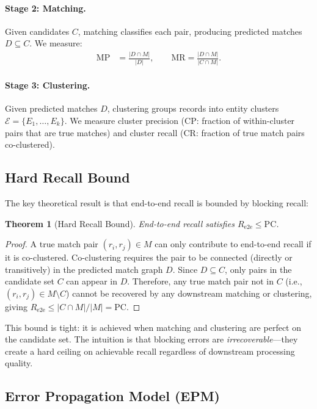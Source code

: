 \documentclass{article}
\newtheorem{theorem}{Theorem}
\newcommand{\PC}{\mathrm{PC}}
\newcommand{\MP}{\mathrm{MP}}
\newcommand{\MR}{\mathrm{MR}}
\newcommand{\CP}{\mathrm{CP}}
\newcommand{\CR}{\mathrm{CR}}
\newcommand{\Ree}{R_{\mathrm{e2e}}}
\begin{document}
\paragraph{Stage 2: Matching.} Given candidates $C$, matching classifies each pair, producing predicted matches $D \subseteq C$. We measure:
\begin{align}
    \MP &= \frac{|D \cap M|}{|D|}, \qquad \MR = \frac{|D \cap M|}{|C \cap M|}.
\end{align}

\paragraph{Stage 3: Clustering.} Given predicted matches $D$, clustering groups records into entity clusters $\mathcal{E} = \{E_1, \ldots, E_k\}$. We measure cluster precision ($\CP$: fraction of within-cluster pairs that are true matches) and cluster recall ($\CR$: fraction of true match pairs co-clustered).

\subsection{Hard Recall Bound}

The key theoretical result is that end-to-end recall is bounded by blocking recall:

\begin{theorem}[Hard Recall Bound]
\label{thm:recall_bound}
End-to-end recall satisfies $\Ree \leq \PC$.
\end{theorem}

\begin{proof}
A true match pair $(r_i, r_j) \in M$ can only contribute to end-to-end recall if it is co-clustered. Co-clustering requires the pair to be connected (directly or transitively) in the predicted match graph $D$. Since $D \subseteq C$, only pairs in the candidate set $C$ can appear in $D$. Therefore, any true match pair not in $C$ (i.e., $(r_i, r_j) \in M \setminus C$) cannot be recovered by any downstream matching or clustering, giving $\Ree \leq |C \cap M| / |M| = \PC$.
\end{proof}

This bound is tight: it is achieved when matching and clustering are perfect on the candidate set. The intuition is that blocking errors are \emph{irrecoverable}---they create a hard ceiling on achievable recall regardless of downstream processing quality.

\subsection{Error Propagation Model (EPM)}
\end{document}
